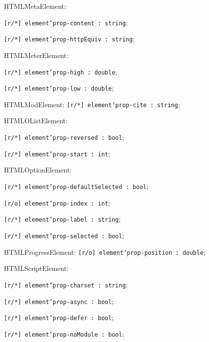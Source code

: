 \begin{icItems}
	\item HTMLMetaElement:
	\begin{icItems}
		\item \texttt{[r/*] element'prop-content : string};
		\item \texttt{[r/*] element'prop-httpEquiv : string};
	\end{icItems}
	
	\item HTMLMeterElement:
	\begin{icItems}
		\item \texttt{[r/*] element'prop-high : double};
		\item \texttt{[r/*] element'prop-low : double};
	\end{icItems}
	
	\item HTMLModElement: \texttt{[r/*] element'prop-cite : string};
	
	\item HTMLOListElement:
	\begin{icItems}
		\item \texttt{[r/*] element'prop-reversed : bool};
		\item \texttt{[r/*] element'prop-start : int};
	\end{icItems}
	
	\item HTMLOptionElement:
	\begin{icItems}
		\item \texttt{[r/*] element'prop-defaultSelected : bool};
		\item \texttt{[r/o] element'prop-index : int};
		\item \texttt{[r/*] element'prop-label : string};
		\item \texttt{[r/*] element'prop-selected : bool};
	\end{icItems}
	
	\item HTMLProgressElement: \texttt{[r/o] element'prop-position : double};
	
	\item HTMLScriptElement:
	\begin{icItems}
		\item \texttt{[r/*] element'prop-charset : string};
		\item \texttt{[r/*] element'prop-async : bool};
		\item \texttt{[r/*] element'prop-defer : bool};
		\item \texttt{[r/*] element'prop-noModule : bool};
	\end{icItems}
	

\end{icItems}
